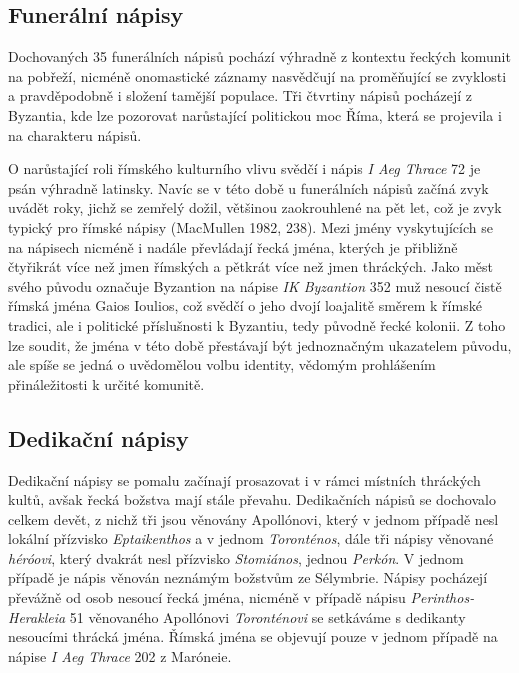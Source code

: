 \subsection[funerální-nápisy-10]{Funerální nápisy}

Dochovaných 35 funerálních nápisů pochází výhradně z kontextu řeckých komunit na pobřeží, nicméně onomastické záznamy nasvědčují na proměňující se zvyklosti a pravděpodobně i složení tamější populace. Tři čtvrtiny nápisů pocházejí z Byzantia, kde lze pozorovat narůstající politickou moc Říma, která se projevila i na charakteru nápisů.

O narůstající roli římského kulturního vlivu svědčí i nápis {\em I Aeg Thrace} 72 je psán výhradně latinsky. Navíc se v této době u funerálních nápisů začíná zvyk uvádět roky, jichž se zemřelý dožil, většinou zaokrouhlené na pět let, což je zvyk typický pro římské nápisy (MacMullen 1982, 238). Mezi jmény vyskytujících se na nápisech nicméně i nadále převládají řecká jména, kterých je přibližně čtyřikrát více než jmen římských a pětkrát více než jmen thráckých. Jako měst svého původu označuje Byzantion na nápise {\em IK Byzantion} 352 muž nesoucí čistě římská jména Gaios Ioulios, což svědčí o jeho dvojí loajalitě směrem k římské tradici, ale i politické příslušnosti k Byzantiu, tedy původně řecké kolonii. Z toho lze soudit, že jména v této době přestávají být jednoznačným ukazatelem původu, ale spíše se jedná o uvědomělou volbu identity, vědomým prohlášením přináležitosti k určité komunitě.

\subsection[dedikační-nápisy-10]{Dedikační nápisy}

Dedikační nápisy se pomalu začínají prosazovat i v rámci místních thráckých kultů, avšak řecká božstva mají stále převahu. Dedikačních nápisů se dochovalo celkem devět, z nichž tři jsou věnovány Apollónovi, který v jednom případě nesl lokální přízvisko {\em Eptaikenthos} a v jednom {\em Toronténos}, dále tři nápisy věnované {\em héróovi}, který dvakrát nesl přízvisko {\em Stomiános}, jednou {\em Perkón}. V jednom případě je nápis věnován neznámým božstvům ze Sélymbrie. Nápisy pocházejí převážně od osob nesoucí řecká jména, nicméně v případě nápisu {\em Perinthos-Herakleia} 51 věnovaného Apollónovi {\em Toronténovi} se setkáváme s dedikanty nesoucími thrácká jména. Římská jména se objevují pouze v jednom případě na nápise {\em I Aeg Thrace} 202 z Maróneie.

